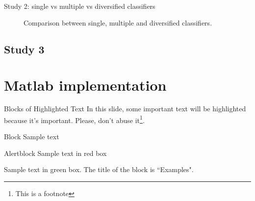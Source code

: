 \documentclass[12pt]{beamer}
\begin{document}
\begin{frame}{Study 2: single vs multiple vs diversified classifiers}
  \begin{figure}
    \centering
    \hfill
    \hfill
    \caption{Comparison between single, multiple and diversified classifiers.}
\end{figure}
\end{frame}


\subsection{Study 3}



\section{Matlab implementation}


\begin{frame}{Blocks of Highlighted Text}
    In this slide, some important text will be \alert{highlighted} because it's important. Please, don't abuse it\footnote{This is a footnote}.

    \begin{block}{Block}
        Sample text
    \end{block}

    \begin{alertblock}{Alertblock}
        Sample text in red box
    \end{alertblock}

    \begin{examples}
        Sample text in green box. The title of the block is ``Examples".
    \end{examples}
\end{frame}
\end{document}

